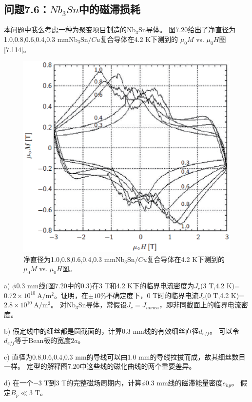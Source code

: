 \subsection{问题7.6：$Nb_3Sn$中的磁滞损耗}
本问题中我么考虑一种为聚变项目制造的$\mathrm{Nb_3 Sn}$导体。
图7.20给出了净直径为1.0,0.8,0.6,0.4,0.3 mm$\mathrm{Nb_3 Sn}/Cu$复合导体在4.2 K下测到的
$\mu_0 M$ vs. $\mu_0 H$图[7.114]。
\begin{figure}[htbp]
	\centering
	\includegraphics[scale=0.7]{chpt7/figs/fig7.20.eps}
	\caption{净直径为1.0,0.8,0.6,0.4,0.3 mm$\mathrm{Nb_3 Sn}/Cu$复合导体在4.2 K下测到的
		$\mu_0 M$ vs. $\mu_0 H$图。}
\end{figure}

a) $\phi$0.3 mm线(图7.20中的0.3)在3 T和4.2 K下的临界电流密度为$J_c$(3 T,4.2 K)=$0.72\times 10^{10}\ \mathrm{ A/m^2}$。证明，在$\pm 10\%$不确定度下，0 T时的临界电流$J_c$(0 T,4.2 K)=$2.8\times 10^{10}\ \mathrm{ A/m^2}$。
对$\mathrm{Nb_3 Sn}$导体，常假设$J_c=J_{noncu}$，即非同截面上的临界电流密度。

b) 假定线中的细丝都是圆截面的，计算0.3 mm线的有效细丝直径$d_{eff}$。
可以令$d_{eff}$等于Bean板的宽度$2a$。

c) 直径为0.8,0.6,0.4,0.3 mm的导线可以由1.0 mm的导线拉拔而成，故其细丝数目一样。
定型的解释图7.20中这些线的磁化曲线的两个重要差异。

d) 在一个$-3$ T到3 T的完整磁场周期内，计算$\phi$0.3 mm线的磁滞能量密度$e_{hy}$。
假定$B_p\ll$3 T。

